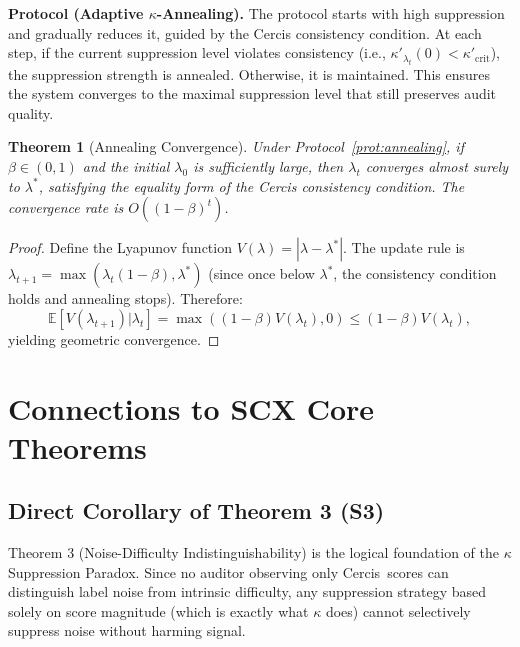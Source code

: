 \documentclass[12pt,a4paper]{article}
\newtheorem{theorem}{Theorem}[section]
\theoremstyle{definition}
\newcommand{\E}{\mathbb{E}}
\newcommand{\Cercis}{\textsf{Cercis}}
\begin{document}
\noindent
\textbf{Protocol (Adaptive $\kappa$-Annealing).}
The protocol starts with high suppression and gradually reduces it, guided by the Cercis consistency condition. At each step, if the current suppression level violates consistency (i.e., $\kappa'_{\lambda_t}(0) < \kappa'_{\text{crit}}$), the suppression strength is annealed. Otherwise, it is maintained. This ensures the system converges to the maximal suppression level that still preserves audit quality.

\begin{theorem}[Annealing Convergence]
\label{thm:annealing_convergence}
Under Protocol~\ref{prot:annealing}, if $\beta \in (0,1)$ and the initial $\lambda_0$ is sufficiently large, then $\lambda_t$ converges almost surely to $\lambda^*$, satisfying the equality form of the Cercis consistency condition. The convergence rate is $O((1-\beta)^t)$.
\end{theorem}

\begin{proof}
Define the Lyapunov function $V(\lambda) = |\lambda - \lambda^*|$. The update rule is $\lambda_{t+1} = \max(\lambda_t(1-\beta), \lambda^*)$ (since once below $\lambda^*$, the consistency condition holds and annealing stops). Therefore:
\begin{equation}
    \E[V(\lambda_{t+1})|\lambda_t] = \max((1-\beta)V(\lambda_t), 0) \leq (1-\beta)V(\lambda_t),
\end{equation}
yielding geometric convergence.
\end{proof}

\section{Connections to SCX Core Theorems}
\label{sec:connections}

\subsection{Direct Corollary of Theorem 3 (S3)}

Theorem 3 (Noise-Difficulty Indistinguishability) is the logical foundation of the $\kappa$ Suppression Paradox. Since no auditor observing only \Cercis~scores can distinguish label noise from intrinsic difficulty, any suppression strategy based solely on score magnitude (which is exactly what $\kappa$ does) cannot selectively suppress noise without harming signal.
\end{document}
